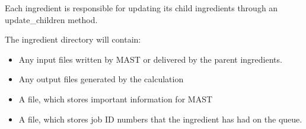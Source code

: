 \documentclass[letterpaper,10pt,english]{sphinxmanual}
\begin{document}
Each ingredient is responsible for updating its child ingredients through an update\_children method.

The ingredient directory will contain:
\begin{itemize}
\item {} 
Any input files written by MAST or delivered by the parent ingredients.

\item {} 
Any output files generated by the calculation

\item {} 
A  file, which stores important information for MAST

\item {} 
A  file, which stores job ID numbers that the ingredient has had on the queue.

\end{itemize}
\end{document}
